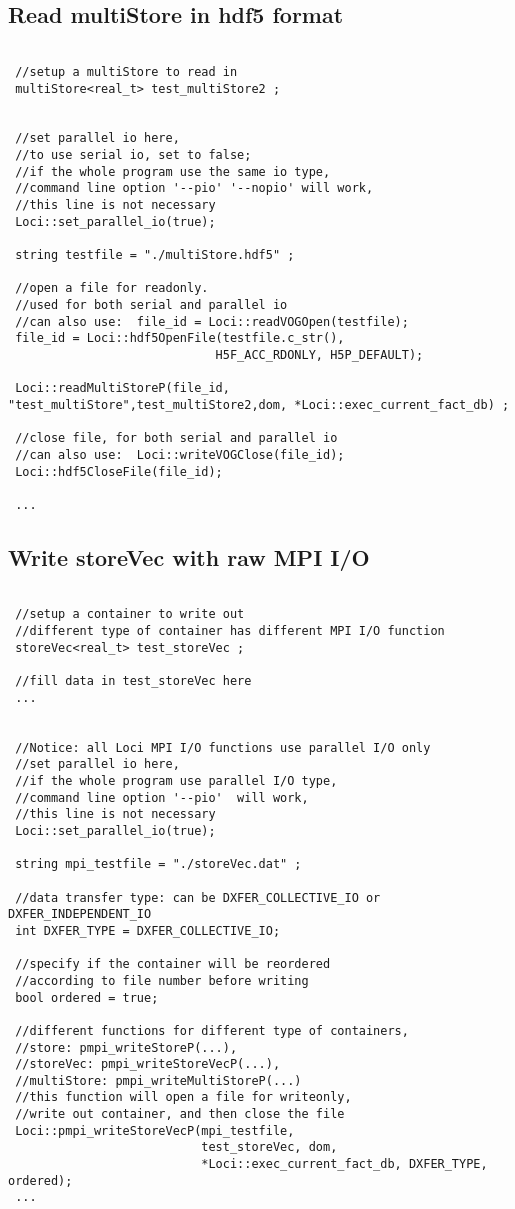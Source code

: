\documentclass{article}
\begin{document}
\subsection {Read  multiStore  in hdf5 format }

\begin{lstlisting}

 //setup a multiStore to read in 
 multiStore<real_t> test_multiStore2 ;


 //set parallel io here,
 //to use serial io, set to false; 
 //if the whole program use the same io type, 
 //command line option '--pio' '--nopio' will work,
 //this line is not necessary  
 Loci::set_parallel_io(true);
 
 string testfile = "./multiStore.hdf5" ;

 //open a file for readonly. 
 //used for both serial and parallel io
 //can also use:  file_id = Loci::readVOGOpen(testfile);
 file_id = Loci::hdf5OpenFile(testfile.c_str(),
                             H5F_ACC_RDONLY, H5P_DEFAULT);  

 Loci::readMultiStoreP(file_id, "test_multiStore",test_multiStore2,dom, *Loci::exec_current_fact_db) ;

 //close file, for both serial and parallel io
 //can also use:  Loci::writeVOGClose(file_id);
 Loci::hdf5CloseFile(file_id); 
 
 ...

\end{lstlisting}



\subsection {Write storeVec with raw MPI I/O}
\begin{lstlisting}
 
 //setup a container to write out 
 //different type of container has different MPI I/O function 
 storeVec<real_t> test_storeVec ;
 
 //fill data in test_storeVec here
 ...
 

 //Notice: all Loci MPI I/O functions use parallel I/O only 
 //set parallel io here,
 //if the whole program use parallel I/O type, 
 //command line option '--pio'  will work,
 //this line is not necessary 
 Loci::set_parallel_io(true); 

 string mpi_testfile = "./storeVec.dat" ;
 
 //data transfer type: can be DXFER_COLLECTIVE_IO or DXFER_INDEPENDENT_IO
 int DXFER_TYPE = DXFER_COLLECTIVE_IO;
 
 //specify if the container will be reordered 
 //according to file number before writing
 bool ordered = true; 

 //different functions for different type of containers, 
 //store: pmpi_writeStoreP(...),
 //storeVec: pmpi_writeStoreVecP(...), 
 //multiStore: pmpi_writeMultiStoreP(...) 
 //this function will open a file for writeonly, 
 //write out container, and then close the file
 Loci::pmpi_writeStoreVecP(mpi_testfile,
                           test_storeVec, dom,  
                           *Loci::exec_current_fact_db, DXFER_TYPE, ordered); 
 ...
\end{lstlisting}
\end{document}
